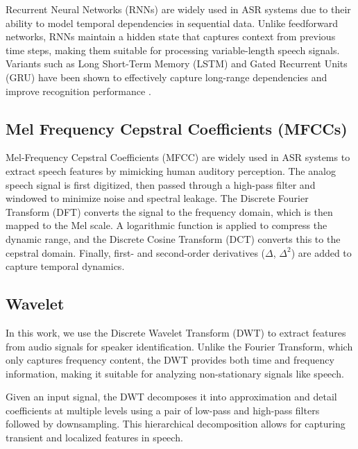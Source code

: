 \documentclass[conference]{IEEEtran}
\begin{document}
Recurrent Neural Networks (RNNs) are widely used in ASR systems due to their ability to model temporal dependencies in sequential data. Unlike feedforward networks, RNNs maintain a hidden state that captures context from previous time steps, making them suitable for processing variable-length speech signals. Variants such as Long Short-Term Memory (LSTM) and Gated Recurrent Units (GRU) have been shown to effectively capture long-range dependencies and improve recognition performance \cite{graves2013speech}.

\subsection{Mel Frequency Cepstral Coefficients (MFCCs)}
Mel-Frequency Cepstral Coefficients (MFCC) are widely used in ASR systems to extract speech features by
mimicking human auditory perception. The analog speech signal is first digitized, then passed through a
high-pass filter and windowed to minimize noise and spectral leakage. The Discrete Fourier Transform (DFT)
converts the signal to the frequency domain, which is then mapped to the Mel scale. A logarithmic function
is applied to compress the dynamic range, and the Discrete Cosine Transform (DCT) converts this to the cepstral
domain. Finally, first- and second-order derivatives ($\Delta$, $\Delta^2$) are added to capture temporal dynamics. \cite{davis1980comparison}













\subsection{Wavelet}

In this work, we use the Discrete Wavelet Transform (DWT) to extract features
from audio signals for speaker identification. Unlike the Fourier Transform,
which only captures frequency content, the DWT provides both time and frequency information, making it suitable for analyzing non-stationary signals like speech.

Given an input signal, the DWT decomposes it into approximation and detail
coefficients at multiple levels using a pair of low-pass and high-pass filters followed by downsampling. This hierarchical decomposition allows for capturing transient and localized features in speech.
\end{document}
